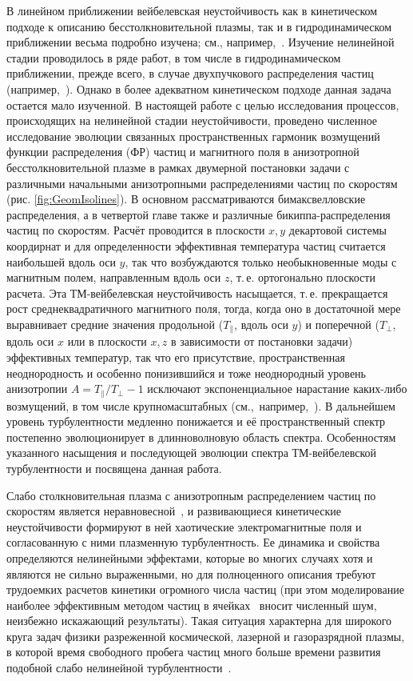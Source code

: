 В линейном приближении вейбелевская неустойчивость как в кинетическом подходе к описанию бесстолкновительной плазмы, так и в гидродинамическом приближении весьма подробно изучена; см., например,~\cite{Kocharovsky2016}. Изучение нелинейной стадии проводилось в ряде работ, в том числе в гидродинамическом приближении, прежде всего, в случае двухпучкового распределения частиц (например,~\cite{Romanov2004,Bychenkov2003}). Однако в более адекватном кинетическом подходе данная задача остается мало изученной. В настоящей работе с целью исследования процессов, происходящих на нелинейной стадии неустойчивости, проведено численное исследование эволюции связанных пространственных гармоник возмущений функции распределения (ФР) частиц и магнитного поля в анизотропной бесстолкновительной плазме в рамках двумерной постановки задачи с различными начальными анизотропными распределениями частиц по скоростям (рис. \ref{fig:GeomIsolines}). В основном рассматриваются бимаксвелловские распределения, а в четвертой главе также и различные бикиппа-распределения частиц по скоростям. Расчёт проводится в плоскости $x,y$ декартовой системы коордирнат и для определенности эффективная температура частиц считается наибольшей вдоль оси $y$, так что возбуждаются только необыкновенные моды с магнитным полем, направленным вдоль оси $z$, т.\,е. ортогонально плоскости расчета. Эта ТМ-вейбелевская неустойчивость насыщается, т.\,е. прекращается рост среднеквадратичного магнитного поля, тогда, когда оно в достаточной мере выравнивает средние значения продольной ($T_{\|}$, вдоль оси $y$) и поперечной ($T_\perp $, вдоль оси $x$ или в плоскости $x,z$ в зависимости от постановки задачи) эффективных температур, так что его присутствие, пространственная неоднородность и особенно понизившийся и тоже неоднородный уровень анизотропии $A={T_{\|}}/{T_{\perp}}-1$ исключают экспоненциальное нарастание каких-либо возмущений, в том числе крупномасштабных (см.,~например,~\cite{Borodachev2016_Radiofiz}). В дальнейшем уровень турбулентности медленно понижается и её пространственный спектр постепенно эволюционирует в длинноволновую область спектра. Особенностям указанного насыщения и последующей эволюции спектра ТМ-вейбелевской турбулентности и посвящена данная работа.

Слабо столкновительная плазма с анизотропным распределением частиц по скоростям является неравновесной~\cite{Mikhailovsky1971,Krall1973}, и развивающиеся кинетические неустойчивости формируют в ней хаотические электромагнитные поля и согласованную с ними плазменную турбулентность. Ее динамика и свойства определяются нелинейными эффектами, которые во многих случаях хотя и являются не сильно выраженными, но для полноценного описания требуют трудоемких расчетов кинетики огромного числа частиц (при этом моделирование наиболее эффективным методом частиц в ячейках~\cite{Kato2005,Borodachev2010,Ruyer2015,Lazar2022,Borodachev2016_Radiofiz,Romanov2004} вносит численный шум, неизбежно искажающий результаты). Такая ситуация характерна для широкого круга задач физики разреженной космической, лазерной и газоразрядной плазмы, в которой время свободного пробега частиц много больше времени развития подобной слабо нелинейной турбулентности~\cite{Baumjohann2012,Treumann2009,Marcowith2016,Gary1993}. 

